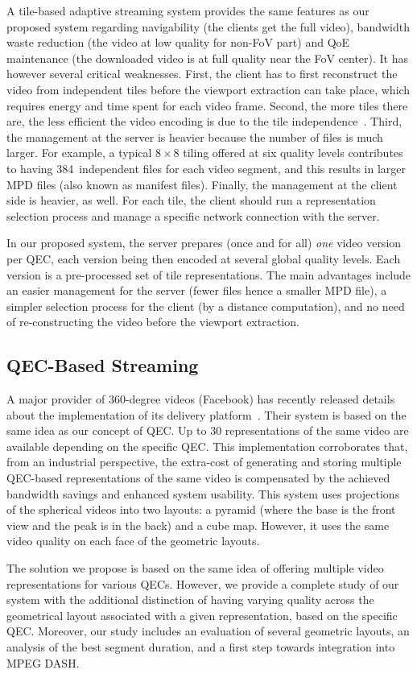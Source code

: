 A tile-based adaptive streaming system provides the same features as
our proposed system regarding navigability (the clients get the full
video), bandwidth waste reduction (the video at low quality for
non-\ac{FoV} part) and \ac{QoE} maintenance (the downloaded video is
at full quality near the \ac{FoV} center). It has however several
critical weaknesses. First, the client has to first reconstruct the
video from independent tiles before the viewport extraction can take
place, which requires energy and time spent for each video frame.
Second, the more tiles there are, the less efficient the video
encoding is due to the tile
independence~\cite{sanchez_compressed_2015}. Third, the management at
the server is heavier because the number of files is much larger. For
example, a typical $8\times8$ tiling offered at six quality levels
contributes to having 384~independent files for each video segment,
and this results in larger \ac{MPD} files (also known as manifest
files). Finally, the management at the client side is heavier, as
well. For each tile, the client should run a representation selection
process and manage a specific network connection with the server.

 In our proposed system, the server prepares
(once and for all) \emph{one} video version per \ac{QEC}, each version
being then encoded at several global quality levels. Each version is a
pre-processed set of tile representations. The main advantages include
an easier management for the server (fewer files hence a smaller
\ac{MPD} file), a simpler selection process for the client (by a
distance computation), and no need of re-constructing the video before
the viewport extraction.

\subsection{QEC-Based Streaming}

A major  provider of 360-degree videos (Facebook) has recently
released details about the implementation of its delivery
platform~\cite{facebook}. Their system is based on the same idea as
our concept of \ac{QEC}. Up to 30 representations of the same video
are available depending on the specific \ac{QEC}. This implementation
corroborates that, from an industrial perspective, the extra-cost of
generating and storing multiple \ac{QEC}-based representations of the
same video is compensated by the achieved bandwidth savings and
enhanced system usability. This system uses projections of the
spherical videos into two layouts: a pyramid (where the base is the
front view and the peak is in the back) and a cube map. However, it
uses the same video quality on each face of the geometric layouts.

 The solution we propose is based on the same
idea of offering multiple video representations for various \acp{QEC}.
However, we provide a complete study of our system with the additional
distinction of having varying quality across the geometrical layout
associated with a given representation, based on the specific
\ac{QEC}. Moreover, our study includes an evaluation of several
geometric layouts, an analysis of the best segment duration, and a
first step towards integration into MPEG \ac{DASH}.
